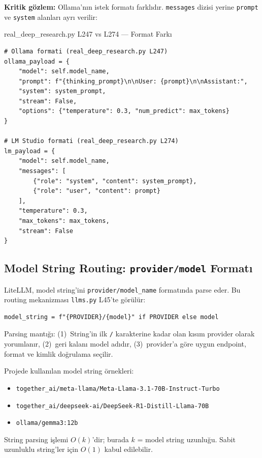 \textbf{Kritik g\"{o}zlem:} Ollama'n{\i}n istek format{\i} farkl{\i}d{\i}r. \texttt{messages} dizisi yerine \texttt{prompt} ve \texttt{system} alanlar{\i} ayr{\i} verilir:

\begin{kodref}{real\_deep\_research.py L247 vs L274 --- Format Fark{\i}}
\begin{lstlisting}
# Ollama formati (real_deep_research.py L247)
ollama_payload = {
    "model": self.model_name,
    "prompt": f"{thinking_prompt}\n\nUser: {prompt}\n\nAssistant:",
    "system": system_prompt,
    "stream": False,
    "options": {"temperature": 0.3, "num_predict": max_tokens}
}

# LM Studio formati (real_deep_research.py L274)
lm_payload = {
    "model": self.model_name,
    "messages": [
        {"role": "system", "content": system_prompt},
        {"role": "user", "content": prompt}
    ],
    "temperature": 0.3,
    "max_tokens": max_tokens,
    "stream": False
}
\end{lstlisting}
\end{kodref}


\subsection{Model String Routing: \texttt{provider/model} Format{\i}}
\label{sec:model-routing}

LiteLLM, model string'ini \texttt{provider/model\_name} format{\i}nda parse eder. Bu routing mekanizmas{\i} \texttt{llms.py} L45'te g\"{o}r\"{u}l\"{u}r:

\begin{lstlisting}
model_string = f"{PROVIDER}/{model}" if PROVIDER else model
\end{lstlisting}

Parsing mant{\i}\u{g}{\i}: (1)~String'in ilk \texttt{/} karakterine kadar olan k{\i}s{\i}m provider olarak yorumlan{\i}r, (2)~geri kalan{\i} model ad{\i}d{\i}r, (3)~provider'a g\"{o}re uygun endpoint, format ve kimlik do\u{g}rulama se\c{c}ilir.

\begin{ornek}
Projede kullan{\i}lan model string \"{o}rnekleri:
\begin{itemize}[leftmargin=1.5em]
  \item \texttt{together\_ai/meta-llama/Meta-Llama-3.1-70B-Instruct-Turbo}
  \item \texttt{together\_ai/deepseek-ai/DeepSeek-R1-Distill-Llama-70B}
  \item \texttt{ollama/gemma3:12b}
\end{itemize}
String parsing i\c{s}lemi $O(k)$'dir; burada $k$ = model string uzunlu\u{g}u. Sabit uzunluklu string'ler i\c{c}in $O(1)$ kabul edilebilir.
\end{ornek}

